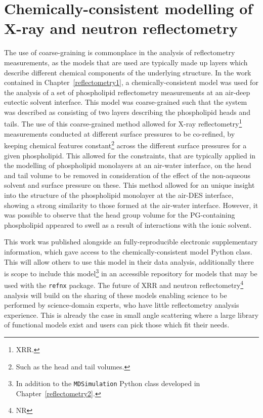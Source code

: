 \section{Chemically-consistent modelling of X-ray and neutron reflectometry}
The use of coarse-graining is commonplace in the analysis of reflectometry measurements, as the models that are used are typically made up layers which describe different chemical components of the underlying structure.
In the work contained in Chapter~\ref{reflectometry1}, a chemically-consistent model was used for the analysis of a set of phospholipid reflectometry measurements at an air-deep eutectic solvent interface.
This model was coarse-grained such that the system was described as consisting of two layers describing the phospholipid heads and tails.
The use of this coarse-grained method allowed for X-ray reflectometry\footnote{XRR.} measurements conducted at different surface pressures to be co-refined, by keeping chemical features constant\footnote{Such as the head and tail volumes.} across the different surface pressures for a given phospholipid.
This allowed for the constraints, that are typically applied in the modelling of phospholipid monolayers at an air-water interface, on the head and tail volume to be removed in consideration of the effect of the non-aqueous solvent and surface pressure on these.
This method allowed for an unique insight into the structure of the phospholipid monolayer at the air-DES interface, showing a strong similarity to those formed at the air-water interface.
However, it was possible to observe that the head group volume for the PG-containing phospholipid appeared to swell as a result of interactions with the ionic solvent.

This work was published alongside an fully-reproducible electronic supplementary information,\autocite{mccluskey_bayesian_2019,mccluskey_lipids_at_airdes_2019} which gave access to the chemically-consistent model Python class.
This will allow others to use this model in their data analysis, additionally there is scope to include this model\footnote{In addition to the \texttt{MDSimulation} Python class developed in Chapter~\ref{reflectometry2}.} in an accessible repository for models that may be used with the \texttt{refnx} package.\autocite{nelson_refnx_2019,nelson_refnx_2019-1,nelson_refnx-models_nodate}
The future of XRR and neutron reflectometry\footnote{NR} analysis will build on the sharing of these models enabling science to be performed by science-domain experts, who have little reflectometry analysis experience.
This is already the case in small angle scattering where a large library of functional models exist and users can pick those which fit their needs.\autocite{noauthor_sasfit_nodate,noauthor_sasview_nodate}

